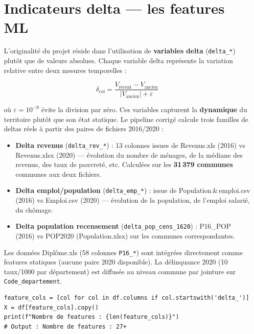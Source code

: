 \documentclass[12pt,a4paper,oneside]{report}
\newcommand{\code}[1]{\texttt{\small #1}}
\begin{document}
\section{Indicateurs delta — les features ML}

L'originalité du projet réside dans l'utilisation de \textbf{variables delta} (\code{delta\_*}) plutôt que de valeurs absolues. Chaque variable delta représente la variation relative entre deux mesures temporelles :

\begin{equation}
  \delta_{\text{col}} = \frac{V_{\text{récent}} - V_{\text{ancien}}}{\lvert V_{\text{ancien}} \rvert + \varepsilon}
  \label{eq:delta}
\end{equation}

où $\varepsilon = 10^{-9}$ évite la division par zéro. Ces variables capturent la \textbf{dynamique} du territoire plutôt que son état statique. Le pipeline corrigé calcule trois familles de deltas réels à partir des paires de fichiers 2016/2020 :

\begin{itemize}
  \item \textbf{Delta revenus} (\code{delta\_rev\_*}) : 13 colonnes issues de Revenus.xls (2016) vs Revenus.xlsx (2020) — évolution du nombre de ménages, de la médiane des revenus, des taux de pauvreté, etc. Calculées sur les \textbf{31\,379 communes} communes aux deux fichiers.
  \item \textbf{Delta emploi/population} (\code{delta\_emp\_*}) : issue de Population\,\&\,emploi.csv (2016) vs Emploi.csv (2020) — évolution de la population, de l'emploi salarié, du chômage.
  \item \textbf{Delta population recensement} (\code{delta\_pop\_cens\_1620}) : P16\_POP (2016) vs POP2020 (Population.xlsx) sur les communes correspondantes.
\end{itemize}

Les données Diplôme.xls (58 colonnes \code{P16\_*}) sont intégrées directement comme features statiques (aucune paire 2020 disponible). La délinquance 2020 (10 taux/1000 par département) est diffusée au niveau commune par jointure sur \code{Code\_departement}.

\begin{lstlisting}[caption={Extraction automatique des features delta — ML notebook}]
feature_cols = [col for col in df.columns if col.startswith('delta_')]
X = df[feature_cols].copy()
print(f"Nombre de features : {len(feature_cols)}")
# Output : Nombre de features : 27+
\end{lstlisting}
\end{document}
